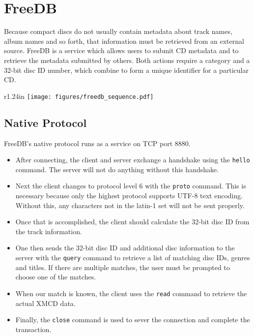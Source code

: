 \chapter{FreeDB}
Because compact discs do not usually contain metadata about
track names, album names and so forth, that information
must be retrieved from an external source.
FreeDB is a service which allows users to submit CD
metadata and to retrieve the metadata submitted by others.
Both actions require a category and a 32-bit disc ID number,
which combine to form a unique identifier for a particular CD.




\begin{wrapfigure}[18]{r}{1.24in}
\texttt{[image: figures/freedb\_sequence.pdf]}
\end{wrapfigure}
\section{Native Protocol}
FreeDB's native protocol runs as a service on TCP port 8880.
\begin{itemize}
\item After connecting, the client and server exchange a handshake using
the \texttt{hello} command.
The server will not do anything without this handshake.

\item Next the client changes to protocol level 6 with
the \texttt{proto} command.
This is necessary because only the highest protocol supports
UTF-8 text encoding.
Without this, any characters not in the latin-1 set will not be
sent properly.

\item Once that is accomplished, the client should calculate the 32-bit
disc ID from the track information.

\item One then sends the 32-bit disc ID and additional disc information
to the server with the \texttt{query} command to retrieve a list of
matching disc IDs, genres and titles.
If there are multiple matches, the user must be prompted to
choose one of the matches.

\item When our match is known, the client uses the \texttt{read} command
to retrieve the actual XMCD data.

\item Finally, the \texttt{close} command is used to sever the connection
and complete the transaction.
\end{itemize}

